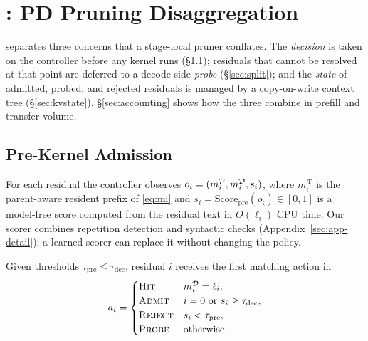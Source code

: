 \section{\sys: PD Pruning Disaggregation}
\label{sec:design}

\sys separates three concerns that a stage-local pruner conflates.
The \emph{decision} is taken on the controller before any kernel runs (\S\ref{sec:app}); residuals that cannot be resolved at that point are deferred to a decode-side \emph{probe} (\S\ref{sec:split}); and the \emph{state} of admitted, probed, and rejected residuals is managed by a copy-on-write context tree (\S\ref{sec:kvstate}).
\S\ref{sec:accounting} shows how the three combine in prefill and transfer volume.

\subsection{Pre-Kernel Admission}
\label{sec:app}

For each residual the controller observes $o_i=(m_i^{\mathcal{P}},m_i^{\mathcal{D}},s_i)$, where $m_i^{\mathcal{X}}$ is the parent-aware resident prefix of \eqref{eq:mi} and $s_i=\mathrm{Score}_{\mathrm{pre}}(\rho_i)\in[0,1]$ is a model-free score computed from the residual text in $O(\ell_i)$ CPU time.
Our scorer combines repetition detection and syntactic checks (Appendix~\ref{sec:app-detail}); a learned scorer can replace it without changing the policy.

\begin{definition}
\label{def:action}
Given thresholds $\tau_{\mathrm{pre}}\le\tau_{\mathrm{dec}}$, residual $i$ receives the first matching action in
\begin{equation}
\label{eq:action}
a_i=
\begin{cases}
\textsc{Hit} & m_i^{\mathcal{D}}=\ell_i,\\
\textsc{Admit} & i=0\ \text{or}\ s_i\ge\tau_{\mathrm{dec}},\\
\textsc{Reject} & s_i<\tau_{\mathrm{pre}},\\
\textsc{Probe} & \text{otherwise}.
\end{cases}
\end{equation}
\end{definition}


